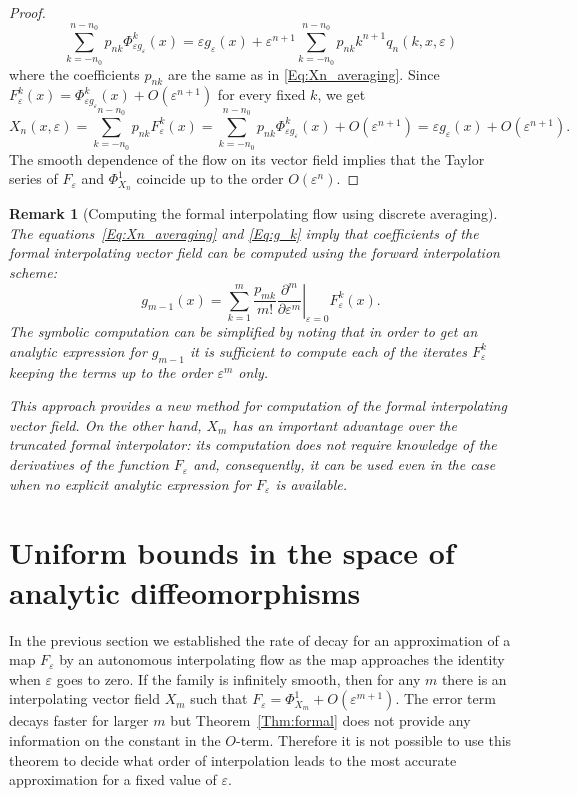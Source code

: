 \documentclass[a4paper,12pt]{article}
\newtheorem{remark}[thm]{Remark}
\begin{document}
\begin{proof}
\[
\sum_{k=-n_0}^{n-n_0}p_{nk}\Phi_{\varepsilon g_\varepsilon}^k(x)
=\varepsilon g_\varepsilon(x)+
\varepsilon^{n+1}
\sum_{k=-n_0}^{n-n_0}p_{nk}k^{n+1}q_n(k,x,\varepsilon)
\]
where the coefficients $p_{nk}$ are the same as in \eqref{Eq:Xn_averaging}.
Since $F_\varepsilon^k(x)=\Phi_{\varepsilon g_\varepsilon}^k(x)+O(\varepsilon^{n+1})$
for every fixed $k$,
we get
\[
X_{n}(x,\varepsilon)=\sum_{k=-n_0}^{n-n_0}p_{nk}F_\varepsilon^k(x)=
\sum_{k=-n_0}^{n-n_0}p_{nk}\Phi_{\varepsilon g_\varepsilon}^k(x)+O(\varepsilon^{n+1})
=\varepsilon g_\varepsilon(x)+O(\varepsilon^{n+1}).
\]
The smooth dependence of the flow on its vector field implies that
 the Taylor series of $F_\varepsilon$ and $\Phi^1_{X_n}$
coincide up to the order $O(\varepsilon^n)$. 
\end{proof}

\begin{remark}[Computing the formal interpolating flow using discrete averaging]
The equations~\eqref{Eq:Xn_averaging} and \eqref{Eq:g_k} imply that 
 coefficients of the formal interpolating vector field can be computed
using the forward interpolation scheme:
\[
g_{m-1}(x)=\sum_{k=1}^m\frac{p_{mk}}{m!}\left.\frac{\partial^m}{\partial \varepsilon^m}\right|_{\varepsilon=0}F^k_\varepsilon(x).
\]
The symbolic computation can be simplified by noting that 
in order to get an analytic expression for $g_{m-1}$ it is sufficient
to compute each of the  iterates  $F^k_\varepsilon$ keeping the terms up to the order $\varepsilon^m$
only.

This approach provides a new method for computation of the
formal interpolating vector field. On the other hand,
 $X_m$ has an important advantage over the truncated formal interpolator: 
its computation does not require knowledge of the derivatives of the  function
$F_\varepsilon$ and, consequently, it can be used 
 even in 
the case when no explicit analytic expression for $F_\varepsilon$ is  available.
\end{remark}


\section{Uniform bounds in the space of analytic diffeomorphisms\label{Se:neishtadt}}

In the previous section we established the rate of decay
for an approximation of a map $F_\varepsilon$ by an autonomous interpolating flow as the map approaches the identity when $\varepsilon$ goes to zero. If the family is infinitely smooth, then for any $m$ there is an interpolating vector field $X_m$
such that $F_\varepsilon=\Phi^1_{X_m}+O(\varepsilon^{m+1})$.
The error term decays faster for larger  $m$ but Theorem~\ref{Thm:formal} does not provide any information
on the constant in the $O$-term. Therefore it is not
possible to use this theorem to decide what order of interpolation leads to the most accurate approximation for a fixed value of $\varepsilon$.
\end{document}
